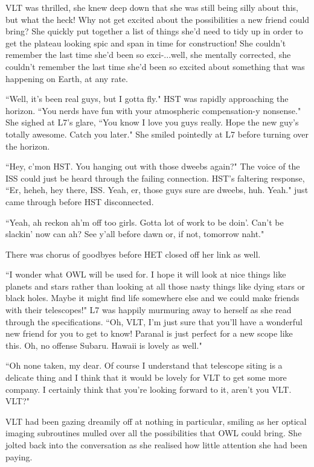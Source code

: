 \documentclass[12pt]{iopart}
\begin{document}
VLT was thrilled, she knew deep down that she was still being silly about this, but what the heck! Why not get excited about the possibilities a new friend could bring? She quickly put together a list of things she'd need to tidy up in order to get the plateau looking spic and span in time for construction! She couldn't remember the last time she'd been so exci-...well, she mentally corrected, she couldn't remember the last time she'd been so excited about something that was happening on Earth, at any rate.

``Well, it's been real guys, but I gotta fly." HST was rapidly approaching the horizon. ``You nerds have fun with your atmospheric compensation-y nonsense." She sighed at L7's glare, ``You know I love you guys really. Hope the new guy's totally awesome. Catch you later." She smiled pointedly at L7 before turning over the horizon. 

``Hey, c'mon HST. You hanging out with those dweebs again?" The voice of the ISS could just be heard through the failing connection. HST's faltering response, ``Er, heheh, hey there, ISS. Yeah, er, those guys sure are dweebs, huh. Yeah." just came through before HST disconnected.

``Yeah, ah reckon ah'm off too girls. Gotta lot of work to be doin'. Can't be slackin' now can ah? See y'all before dawn or, if not, tomorrow naht."

There was chorus of goodbyes before HET closed off her link as well.

``I wonder what OWL will be used for. I hope it will look at nice things like planets and stars rather than looking at all those nasty things like dying stars or black holes. Maybe it might find life somewhere else and we could make friends with their telescopes!" L7 was happily murmuring away to herself as she read through the specifications. ``Oh, VLT, I'm just sure that you'll have a wonderful new friend for you to get to know! Paranal is just perfect for a new scope like this. Oh, no offense Subaru. Hawaii is lovely as well."

``Oh none taken, my dear. Of course I understand that telescope siting is a delicate thing and I think that it would be lovely for VLT to get some more company. I certainly think that you're looking forward to it, aren't you VLT. VLT?"

VLT had been gazing dreamily off at nothing in particular, smiling as her optical imaging subroutines mulled over all the possibilities that OWL could bring. She jolted back into the conversation as she realised how little attention she had been paying.
\end{document}
